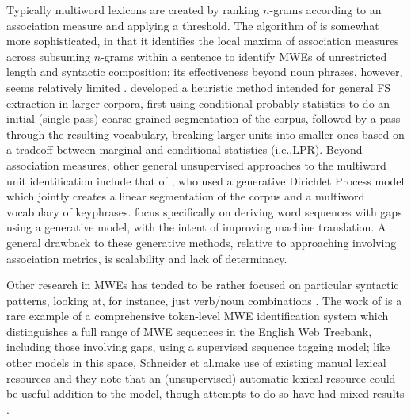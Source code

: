 \documentclass[11pt,letterpaper]{article}
\makeatletter
\def \ie {i.e.,\@ }
\def \al {al.\@ }
\makeatother
\begin{document}
Typically multiword lexicons are created by ranking $n$-grams according to an association measure and applying a threshold. The algorithm of  is somewhat more sophisticated, in that it identifies the local maxima of association measures across subsuming $n$-grams within a sentence to identify MWEs of unrestricted length and syntactic composition; its effectiveness beyond noun phrases, however, seems relatively limited \cite{Ramisch12}.  developed a heuristic method intended for general FS extraction in larger corpora, first using conditional probably statistics to do an initial (single pass) coarse-grained segmentation of the corpus, followed by a pass through the resulting vocabulary, breaking larger units into smaller ones based on a tradeoff between marginal and conditional statistics (\ie LPR). Beyond association measures, other general unsupervised approaches to the multiword unit identification include that of , who used a generative Dirichlet Process model which jointly creates a linear segmentation of the corpus and a multiword vocabulary of keyphrases.  focus specifically on deriving word sequences with gaps using a generative model, with the intent of improving machine translation. A general drawback to these generative methods, relative to approaching involving association metrics, is scalability and lack of determinacy.

Other research in MWEs has tended to be rather focused on particular syntactic patterns, looking at, for instance, just verb/noun combinations \cite{Fazly09}. The work of  is a rare example of a comprehensive token-level MWE identification system which distinguishes a full range of MWE sequences in the English Web Treebank, including those involving gaps, using a supervised sequence tagging model; like other models in this space, Schneider et \al make use of existing manual lexical resources and they note that an (unsupervised) automatic lexical resource could be useful addition to the model, though attempts to do so have had mixed results \cite{Riedl16}. 
\end{document}
